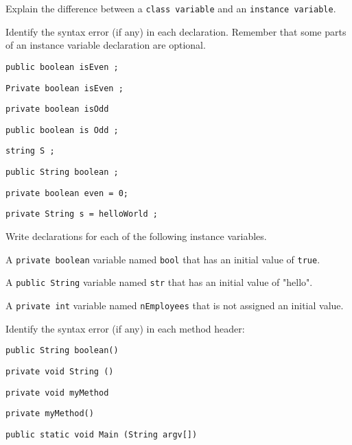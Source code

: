 \begin{EXRtwo}
\item  Explain the difference between a {\tt class variable} and
an {\tt instance variable}.

\item  Identify the syntax error (if any) in each declaration.
Remember that some parts of an instance variable declaration are optional.

\begin{EXRtwoLL}
\item  {\tt public boolean isEven ;}
\item  {\tt Private boolean isEven ;}
\item  {\tt private boolean isOdd}
\item  {\tt public boolean is Odd ;}
\item  {\tt string S ;}
\item  {\tt public String boolean ;}
\item  {\tt private boolean even = 0;}
\item  {\tt private String s = helloWorld ;}
\end{EXRtwoLL}

\item  Write declarations for each of the following
instance variables.

\begin{EXRtwoLL}
\item  A {\tt private boolean} variable named {\tt bool} that has
an initial value of {\tt true}.
\item  A {\tt public String} variable named {\tt str} that has an initial
value of "hello".
\item  A {\tt private int} variable named {\tt nEmployees} that is
not assigned an initial value.
\end{EXRtwoLL}


\item  Identify the syntax error (if any) in each method header:

\begin{EXRtwoLL}
\item  {\tt public String boolean()}
\item  {\tt private void String ()}
\item  {\tt private void myMethod}
\item  {\tt private myMethod()}
\item  {\tt public static void Main (String argv[])}
\end{EXRtwoLL}


\end{EXRtwo}
